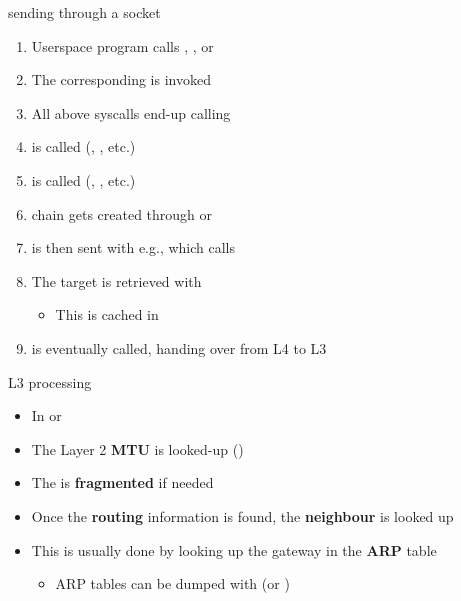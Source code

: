 \begin{frame}{sending through a socket}
	\begin{enumerate}
		\item Userspace program calls , ,  or  
		\item The corresponding  is invoked
		\item All above syscalls end-up calling 
		\item {} is called (, , etc.)
		\item {} is called (, , etc.)
		\item {} chain gets created through  or 
		\item {} is then sent with e.g., which calls 
		\item The target  is retrieved with 
			\begin{itemize}
				\item This is cached in 
			\end{itemize}
		\item {} is eventually called, handing over from L4 to L3
	\end{enumerate}
\end{frame}

\begin{frame}{L3 processing}
	\begin{itemize}
		\item In  or 
		\item The Layer 2 \textbf{MTU} is looked-up ()
		\item The  is \textbf{fragmented} if needed
		\item Once the \textbf{routing} information is found, the \textbf{neighbour} is looked up
		\item This is usually done by looking up the gateway in the \textbf{ARP} table
			\begin{itemize}
				\item ARP tables can be dumped with  (or )
			\end{itemize}
	\end{itemize}
\end{frame}



